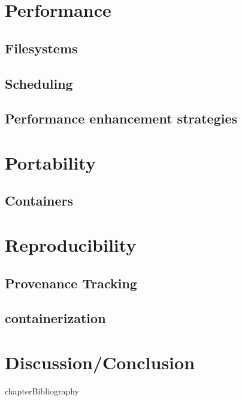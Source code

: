 \documentclass{report}
\begin{document}
    \chapter{Performance}\label{performance}
        \section{Filesystems}
        \section{Scheduling}
        \section{Performance enhancement strategies}
    \chapter{Portability}\label{portability}
        \section{Containers}
    \chapter{Reproducibility}\label{reproducibility}
        \section{Provenance Tracking}
        \section{containerization}
    \chapter{Discussion/Conclusion}


        {chapter}{Bibliography} 
        
        
\end{document}
